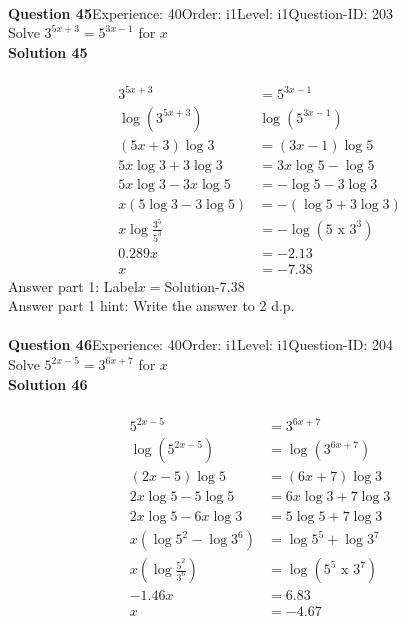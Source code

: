 \documentclass{article}
\begin{document}
\\[4pt]
\noindent\textbf{Question 45}\hspace{20pt}Experience: 40\hspace{20pt}Order: i1\hspace{20pt}Level: i1\hspace{20pt}Question-ID: 203\\[2pt]
Solve $3^{5x+3}=5^{3x-1}$ for $x$\\[4pt]
\noindent\textbf{Solution 45}\\[2pt]
\\[-35pt]\begin{align*}
3^{5x+3}&=5^{3x-1}\\[2pt]
\log(3^{5x+3})&\log(5^{3x-1})\\[2pt]
(5x+3)\log3&=(3x-1)\log5\\[2pt]
5x\log3+3\log3&=3x\log5-\log5\\[2pt]
5x\log3-3x\log5&=-\log5-3\log3\\[2pt]
x(5\log3-3\log5)&=-(\log5+3\log3)\\[2pt]
x\log\displaystyle\frac{3^5}{5^3}&=-\log(5 \,\, \text{x} \,\, 3^3)\\[2pt]
0.289x&=-2.13\\[2pt]
x&=-7.38
\end{align*}
Answer part 1: \hspace{10pt}Label\hspace{10pt}$x=$\hspace{10pt}Solution\hspace{10pt}-7.38\\
Answer part 1 hint: \hspace{15pt}Write the answer to 2 d.p.\\
\\[4pt]
\noindent\textbf{Question 46}\hspace{20pt}Experience: 40\hspace{20pt}Order: i1\hspace{20pt}Level: i1\hspace{20pt}Question-ID: 204\\[2pt]
Solve $5^{2x-5}=3^{6x+7}$ for $x$\\[4pt]
\noindent\textbf{Solution 46}\\[2pt]
\\[-35pt]\begin{align*}
5^{2x-5}&=3^{6x+7}\\[2pt]
\log(5^{2x-5})&=\log(3^{6x+7})\\[2pt]
(2x-5)\log5&=(6x+7)\log3\\[2pt]
2x\log5-5\log5&=6x\log3+7\log3\\[2pt]
2x\log5-6x\log3&=5\log5+7\log3\\[2pt]
x(\log5^2-\log3^6)&=\log5^5+\log3^7\\[2pt]
x\left(\log\displaystyle\frac{5^2}{3^6}\right)&=\log(5^5\,\,\text{x}\,\,3^7)\\[2pt]
-1.46x&=6.83\\[2pt]
x&=-4.67
\end{align*}
\end{document}
